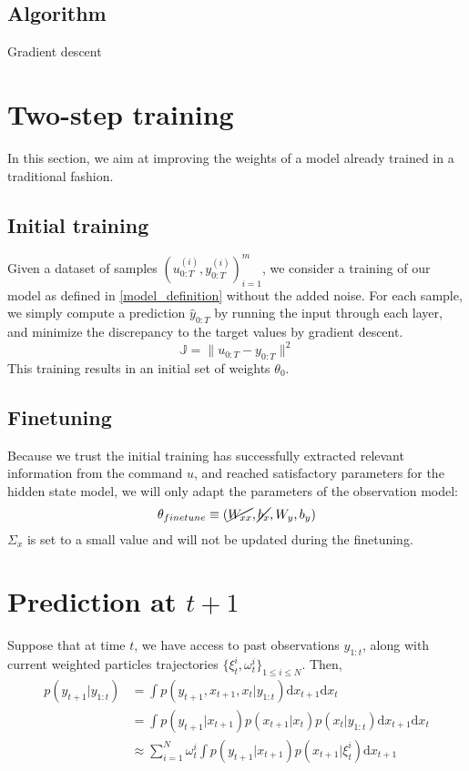 \documentclass[10pt,a4paper]{report}
\begin{document}
\subsection{Algorithm}
\begin{algorithm}
	\caption{Gradient descent}
\end{algorithm}

\section{Two-step training}
In this section, we aim at improving the weights of a model already trained in a traditional fashion.

\subsection{Initial training}
\label{sec:pretrain}
Given a dataset of samples $(u_{0:T}^{(i)}, y_{0:T}^{(i)})_{i=1}^m$, we consider a training of our model as defined in \ref{model_definition} without the added noise.
For each sample, we simply compute a prediction $\hat y_{0:T}$ by running the input through each layer, and minimize the discrepancy to the target values by gradient descent.
$$
	\mathbb{J} = \| u_{0:T} - y_{0:T} \|^2
$$
This training results in an initial set of weights $\theta_0$.

\subsection{Finetuning}
Because we trust the initial training has successfully extracted relevant information from the command $u$, and reached satisfactory parameters for the hidden state model, we will only adapt the parameters of the observation model:
$$
	\theta_{finetune} \equiv (\cancel{W_{xx}}, \cancel{b_x}, W_y, b_y)
$$
$\Sigma_x$ is set to a small value and will not be updated during the finetuning.

\section{Prediction at $t+1$}
Suppose that at time $t$, we have access to past observations $y_{1:t}$, along with current weighted particles trajectories $\{\xi_t^i, \omega_t^i\}_{1 \leq i \leq N}$.
Then,
\begin{align*}
	p(y_{t+1}|y_{1:t}) & = \int p(y_{t+1}, x_{t+1}, x_t|y_{1:t})\mathrm{d}x_{t+1}\mathrm{d}x_t                        \\
			   & = \int p(y_{t+1}|x_{t+1}) p(x_{t+1}|x_t) p(x_t|y_{1:t})\mathrm{d}x_{t+1}\mathrm{d}x_t        \\
			   & \approx \sum_{i=1}^N \omega_t^i \int p(y_{t+1}|x_{t+1}) p(x_{t+1}|\xi_t^i) \mathrm{d}x_{t+1} \\
\end{align*}
\end{document}
